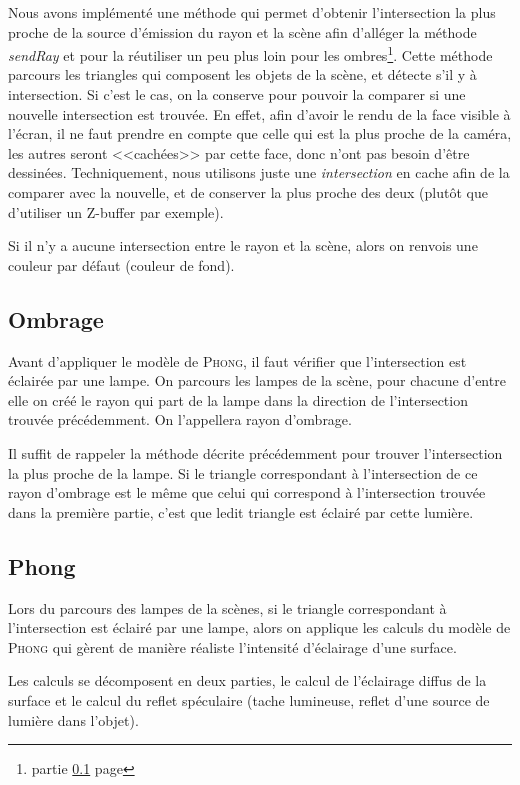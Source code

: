 \documentclass{article}
\begin{document}
Nous avons implémenté une méthode qui permet d'obtenir l'intersection la plus proche de la source d'émission du rayon
et la scène afin d'alléger la méthode \textit{sendRay} et pour la réutiliser un peu plus loin pour les
ombres\footnote{partie \ref{ombre} page \pageref{ombre}}. Cette méthode parcours les triangles qui composent les objets
de la scène, et détecte s'il y à intersection. Si c'est le cas, on la conserve pour pouvoir la comparer si une nouvelle
intersection est trouvée. En effet, afin d'avoir le rendu de la face visible à l'écran, il ne faut prendre en compte que
celle qui est la plus proche de la caméra, les autres seront <<cachées>> par cette face, donc n'ont pas besoin d'être
dessinées. Techniquement, nous utilisons juste une \textit{intersection} en cache afin de la comparer avec la nouvelle, et de
conserver la plus proche des deux (plutôt que d'utiliser un Z-buffer par exemple).

Si il n'y a aucune intersection entre le rayon et la scène, alors on renvois une couleur par défaut (couleur de fond).

\subsection{Ombrage}
\label{ombre}

Avant d'appliquer le modèle de \textsc{Phong}, il faut vérifier que l'intersection est éclairée par une lampe.
On parcours les lampes de la scène, pour chacune d'entre elle on créé le rayon qui part de la lampe dans la direction de l'intersection trouvée
précédemment. On l'appellera rayon d'ombrage.

Il suffit de rappeler la méthode décrite précédemment pour trouver l'intersection la plus proche de la lampe. Si le
triangle correspondant à l'intersection de ce rayon d'ombrage est le même que celui qui correspond à
l'intersection trouvée dans la première partie, c'est que ledit triangle est éclairé par cette lumière.

\subsection{Phong}

Lors du parcours des lampes de la scènes, si le triangle correspondant à l'intersection est éclairé par une lampe, alors
on applique les calculs du modèle de \textsc{Phong} qui gèrent de manière réaliste l'intensité d'éclairage d'une
surface.

Les calculs se décomposent en deux parties, le calcul de l'éclairage diffus de la surface et le calcul du reflet
spéculaire  (tache lumineuse, reflet d'une source de lumière dans l'objet). 
\end{document}
